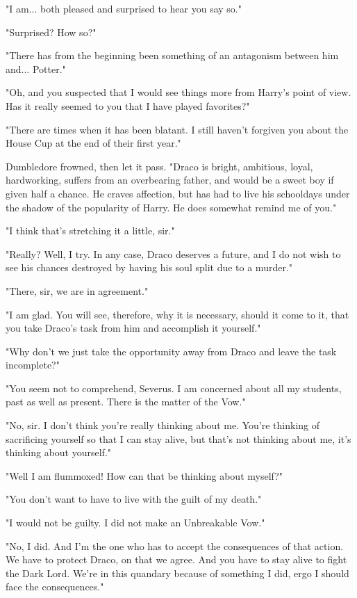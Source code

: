 \documentclass[a4paper,11pt]{article}
\begin{document}
"I am... both pleased and surprised to hear you say so."

"Surprised? How so?"

"There has from the beginning been something of an antagonism between him and... Potter."

"Oh, and you suspected that I would see things more from Harry's point of view. Has it really seemed to you that I have played favorites?"

"There are times when it has been blatant. I still haven't forgiven you about the House Cup at the end of their first year."

Dumbledore frowned, then let it pass. "Draco is bright, ambitious, loyal, hardworking, suffers from an overbearing father, and would be a sweet boy if given half a chance. He craves affection, but has had to live his schooldays under the shadow of the popularity of Harry. He does somewhat remind me of you."

"I think that's stretching it a little, sir."

"Really? Well, I try. In any case, Draco deserves a future, and I do not wish to see his chances destroyed by having his soul split due to a murder."

"There, sir, we are in agreement."

"I am glad. You will see, therefore, why it is necessary, should it come to it, that you take Draco's task from him and accomplish it yourself."

"Why don't we just take the opportunity away from Draco and leave the task incomplete?"

"You seem not to comprehend, Severus. I am concerned about all my students, past as well as present. There is the matter of the Vow."

"No, sir. I don't think you're really thinking about me. You're thinking of sacrificing yourself so that I can stay alive, but that's not thinking about me, it's thinking about yourself."

"Well I am flummoxed! How can that be thinking about myself?"

"You don't want to have to live with the guilt of my death."

"I would not be guilty. I did not make an Unbreakable Vow."

"No, I did. And I'm the one who has to accept the consequences of that action. We have to protect Draco, on that we agree. And you have to stay alive to fight the Dark Lord. We're in this quandary because of something I did, ergo I should face the consequences."
\end{document}

